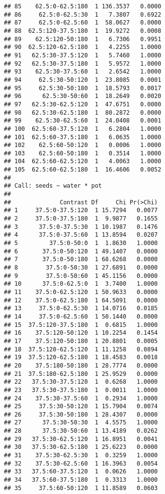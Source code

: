 \begin{knitrout}
\begin{kframe}
\begin{verbatim}
## 85    62.5:0-62.5:180  1 136.3537   0.0000
## 86     62.5:0-62.5:30  1   7.3807   0.6922
## 87     62.5:0-62.5:60  1  58.0627   0.0000
## 88  62.5:120-37.5:180  1  19.9272   0.0008
## 89    62.5:120-50:180  1   6.7306   0.9951
## 90  62.5:120-62.5:180  1   4.2255   1.0000
## 91   62.5:30-37.5:120  1   5.7460   1.0000
## 92   62.5:30-37.5:180  1   5.9572   1.0000
## 93    62.5:30-37.5:60  1   2.6542   1.0000
## 94     62.5:30-50:120  1  23.8085   0.0001
## 95     62.5:30-50:180  1  18.5793   0.0017
## 96      62.5:30-50:60  1  18.2649   0.0020
## 97   62.5:30-62.5:120  1  47.6751   0.0000
## 98   62.5:30-62.5:180  1  80.2872   0.0000
## 99    62.5:30-62.5:60  1  24.0408   0.0001
## 100  62.5:60-37.5:120  1   6.2804   1.0000
## 101  62.5:60-37.5:180  1   6.0635   1.0000
## 102    62.5:60-50:120  1   0.0006   1.0000
## 103    62.5:60-50:180  1   0.3514   1.0000
## 104  62.5:60-62.5:120  1   4.0063   1.0000
## 105  62.5:60-62.5:180  1  16.4606   0.0052
## 
## Call: seeds ~ water * pot
## 
##              Contrast Df     Chi Pr(>Chi)
## 1     37.5:0-37.5:120  1 15.7294   0.0077
## 2     37.5:0-37.5:180  1  9.9877   0.1655
## 3      37.5:0-37.5:30  1 10.1987   0.1476
## 4      37.5:0-37.5:60  1 13.8594   0.0207
## 5         37.5:0-50:0  1  1.8630   1.0000
## 6       37.5:0-50:120  1 49.1407   0.0000
## 7       37.5:0-50:180  1 68.6268   0.0000
## 8        37.5:0-50:30  1 27.6891   0.0000
## 9        37.5:0-50:60  1 45.1156   0.0000
## 10      37.5:0-62.5:0  1  3.7400   1.0000
## 11    37.5:0-62.5:120  1 50.9633   0.0000
## 12    37.5:0-62.5:180  1 64.5091   0.0000
## 13     37.5:0-62.5:30  1 14.0716   0.0185
## 14     37.5:0-62.5:60  1 50.1440   0.0000
## 15  37.5:120-37.5:180  1  0.6815   1.0000
## 16    37.5:120-50:120  1 10.2254   0.1454
## 17    37.5:120-50:180  1 20.8801   0.0005
## 18  37.5:120-62.5:120  1 11.1258   0.0894
## 19  37.5:120-62.5:180  1 18.4583   0.0018
## 20    37.5:180-50:180  1 28.7774   0.0000
## 21  37.5:180-62.5:180  1 25.9529   0.0000
## 22   37.5:30-37.5:120  1  0.6268   1.0000
## 23   37.5:30-37.5:180  1  0.0011   1.0000
## 24    37.5:30-37.5:60  1  0.2934   1.0000
## 25     37.5:30-50:120  1 15.7904   0.0074
## 26     37.5:30-50:180  1 28.4307   0.0000
## 27      37.5:30-50:30  1  4.5575   1.0000
## 28      37.5:30-50:60  1 13.4189   0.0262
## 29   37.5:30-62.5:120  1 16.8951   0.0041
## 30   37.5:30-62.5:180  1 25.6223   0.0000
## 31    37.5:30-62.5:30  1  0.3259   1.0000
## 32    37.5:30-62.5:60  1 16.3963   0.0054
## 33   37.5:60-37.5:120  1  0.0626   1.0000
## 34   37.5:60-37.5:180  1  0.3313   1.0000
## 35     37.5:60-50:120  1 11.8589   0.0603

\end{verbatim}
\end{kframe}
\end{knitrout}
